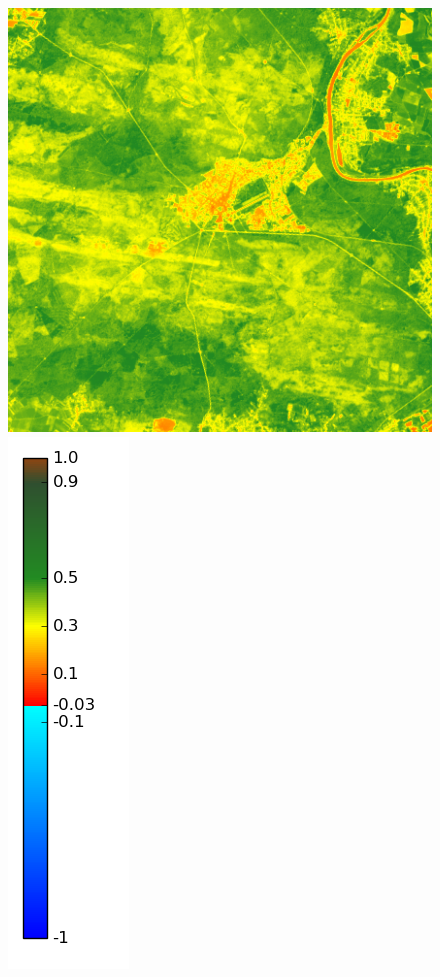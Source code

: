 \documentclass{book}
\begin{document}
\begin{figure}[H]
{\includegraphics[scale=0.25]{images/Fontainebleau/06_ndvi.png}
\includegraphics[scale=0.2]{images/colormap.png}
}
\end{figure}
\end{document}
